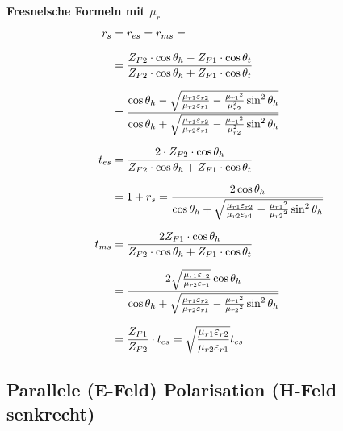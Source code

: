 \textbf{Fresnelsche Formeln mit $\mu_r$}
\begin{equation*}
	\setlength{\jot}{10pt}
	\begin{aligned}
		r_s    & =  r_{es} = r_{ms} =                                                                                                                                            \\
		& = \frac{Z_{F2} \cdot \cos \theta_h-Z_{F1} \cdot \cos \theta_t}{Z_{F2} \cdot \cos \theta_h+Z_{F1} \cdot \cos \theta_t}                                           \\
        & =\frac{\cos \theta_h-\sqrt{\frac{\mu_{r 1} \varepsilon_{r 2}}{\mu_{r 2} \varepsilon_{r 1}}-\frac{\mu_{r 1}{ }^2}{\mu_{r 2}^2} \sin ^2 \theta_h}}{\cos \theta_h+\sqrt{\frac{\mu_{r 1} \varepsilon_{r 2}}{\mu_{r 2} \varepsilon_{r 1}}-\frac{\mu_{r 1}{ }^2}{\mu_{r 2}^2} \sin ^2 \theta_h}} \\
		t_{es} & =\frac{2 \cdot	 Z_{F2} \cdot \cos \theta_h}{Z_{F2} \cdot \cos \theta_h+Z_{F1} \cdot \cos \theta_t}                                                              \\
        & = 1+r_s =\frac{2 \cos \theta_h}{\cos \theta_h+\sqrt{\frac{\mu_{r 1} \varepsilon_{r 2}}{\mu_{r 2} \varepsilon_{r 1}}-\frac{\mu_{r 1}{ }^2}{\mu_{r 2}{ }^2} \sin ^2 \theta_h}} \\
		t_{ms} & = \frac{2 Z_{F1} \cdot \cos \theta_h}{Z_{F2} \cdot \cos \theta_h+Z_{F1} \cdot \cos \theta_t}                                                              \\
		& =\frac{2 \sqrt{\frac{\mu_{r 1} \varepsilon_{r 2}}{\mu_{r 2} \varepsilon_{r 1}}} \cos \theta_h}{\cos \theta_h+\sqrt{\frac{\mu_{r 1} \varepsilon_{r 2}}{\mu_{r 2} \varepsilon_{r 1}}-\frac{\mu_{r 1}{ }^2}{\mu_{r 2}{ }^2} \sin ^2 \theta_h}}
		\\
		& = \frac{Z_{F1}}{Z_{F2}}\cdot t_{es} =\sqrt{\frac{\mu_{r 1} \varepsilon_{r 2}}{\mu_{r 2} \varepsilon_{r 1}}} t_{e s}                                                                                                                   
	\end{aligned}
\end{equation*}


\subsection{Parallele (E-Feld) Polarisation (H-Feld senkrecht) }
\begin{center}

\end{center}

